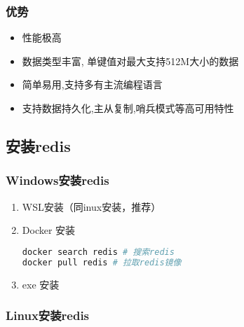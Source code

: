 \subsubsection{优势}
\begin{itemize}
\item 性能极高
\item 数据类型丰富, 单键值对最大支持512M大小的数据
\item 简单易用,支持多有主流编程语言
\item 支持数据持久化,主从复制,哨兵模式等高可用特性
\end{itemize}

\subsection{安装redis}
\subsubsection{Windows安装redis}
\begin{enumerate}
\item WSL安装（同inux安装，推荐）
\item Docker 安装
\begin{lstlisting}[language=bash]
docker search redis # 搜索redis
docker pull redis # 拉取redis镜像
\end{lstlisting}
\item exe 安装

\end{enumerate}
\subsubsection{Linux安装redis}
